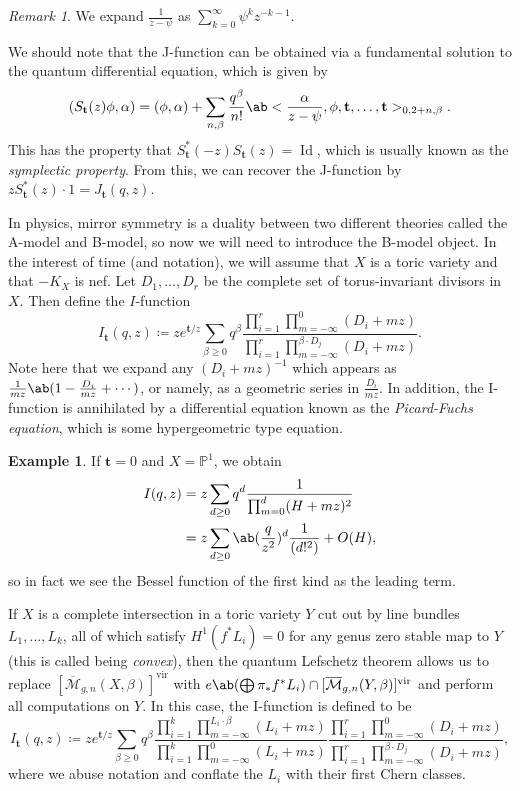 \documentclass{amsart}
\theoremstyle{definition}
\newtheorem{exm}[thm]{Example}
\theoremstyle{remark}
\newtheorem{rmk}[thm]{Remark}
\theoremstyle{plain}
\theoremstyle{definition}
\theoremstyle{remark}
\renewcommand{\P}{\mathbb{P}}
\newcommand{\Mbar}{\overline{\mathcal{M}}}
\newcommand{\mbf}[1]{\mathbf{#1}}
\newcommand{\mr}[1]{\mathrm{#1}}
\newcommand{\on}[1]{\operatorname{#1}}
\newcommand{\1}{\mathbf{1}}
\newcommand{\2}{\mathbf{2}}
\newcommand{\3}{\mathbf{3}}
\newcommand{\vir}{\mr{vir}}
\begin{document}
\begin{rmk}
    We expand \(\frac{1}{z-\psi}\) as \(\sum_{k=0}^{\infty} \psi^k z^{-k-1}\).  
\end{rmk}

We should note that the J-function can be obtained via a fundamental solution to the quantum differential equation, which is given by
\[ ( S_{\mbf{t}}(z) \phi , \alpha) = (\phi, \alpha) + \sum_{n, \beta} \frac{q^{\beta}}{n!} \ab<\frac{\alpha}{z-\psi}, \phi, \mbf{t}, \ldots, \mbf{t}>_{0, 2+n, \beta}. \]
This has the property that \(S_{\mbf{t}}^*(-z) S_{\mbf{t}}(z) = \on{Id}\), which is usually known as the \textit{symplectic property}. From this, we can recover the J-function by \(z S_{\mbf{t}}^*(z)\cdot 1 = J_{\mbf{t}}(q, z)\).

In physics, mirror symmetry is a duality between two different theories called the A-model and B-model, so now we will need to introduce the B-model object. In the interest of time (and notation), we will assume that \(X\) is a toric variety and that \(-K_X\) is nef. Let \(D_1, \ldots, D_r\) be the complete set of torus-invariant divisors in \(X\). Then define the \(I\)-function
\[
    I_{\mbf{t}}(q, z) \coloneqq z e^{\mbf{t}/z} \sum_{\beta \geq 0} q^{\beta} \frac{\prod_{i=1}^r \prod_{m = -\infty}^{0} (D_i + mz)}{\prod_{i=1}^r \prod_{m=-\infty}^{\beta \cdot D_j} (D_i + mz)}.
\]
Note here that we expand any \((D_i + mz)^{-1}\) which appears as \(\frac{1}{mz} \ab(1 - \frac{D_i}{mz} + \cdots)\), or namely, as a geometric series in \(\frac{D_i}{mz}\). In addition, the I-function is annihilated by a differential equation known as the \textit{Picard-Fuchs equation}, which is some hypergeometric type equation.

\begin{exm}
    If \(\mbf{t} = 0\) and \(X = \P^1\), we obtain
    \begin{align*}
        I(q,z) &= z\sum_{d \geq 0} q^d \frac{1}{\prod_{m=0}^d (H + mz)^2} \\
        &= z\sum_{d \geq 0} \ab(\frac{q}{z^2})^d \frac{1}{(d!^2)} + O(H),
    \end{align*}
    so in fact we see the Bessel function of the first kind as the leading term.
\end{exm}

If \(X\) is a complete intersection in a toric variety \(Y\) cut out by line bundles \(L_1, \ldots, L_k\), all of which satisfy \(H^1(f^* L_i) = 0\) for any genus zero stable map to \(Y\) (this is called being \textit{convex}), then the quantum Lefschetz theorem allows us to replace \([\Mbar_{g,n}(X, \beta)]^{\vir}\) with \(e\ab(\bigoplus \pi_* f^* L_i) \cap [\Mbar_{g,n}(Y, \beta)]^{\vir}\) and perform all computations on \(Y\). In this case, the I-function is defined to be
\[
    I_{\mbf{t}}(q,z) \coloneqq z e^{\mbf{t}/z} \sum_{\beta \geq 0} q^{\beta} \frac{\prod_{i=1}^k \prod_{m=-\infty}^{L_i \cdot \beta} (L_i + mz)}{\prod_{i=1}^k \prod_{m=-\infty}^{0} (L_i + mz)} \frac{\prod_{i=1}^r \prod_{m = -\infty}^{0} (D_i + mz)}{\prod_{i=1}^r \prod_{m=-\infty}^{\beta \cdot D_j} (D_i + mz)},
\]
where we abuse notation and conflate the \(L_i\) with their first Chern classes.
\end{document}

